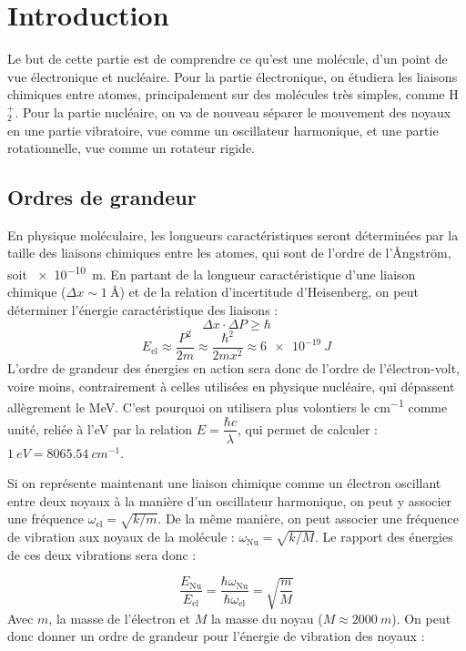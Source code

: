 


\section{Introduction}


Le but de cette partie est de comprendre ce qu'est une molécule, d'un point de vue électronique et nucléaire. Pour la partie électronique, on étudiera les liaisons chimiques entre atomes, principalement sur des molécules très simples, comme H$^+_2$. Pour la partie nucléaire, on va de nouveau séparer le mouvement des noyaux en une partie vibratoire, vue comme un oscillateur harmonique, et une partie rotationnelle, vue comme un rotateur rigide.


\subsection{Ordres de grandeur}


En physique moléculaire, les longueurs caractéristiques seront déterminées par la taille des liaisons chimiques entre les atomes, qui sont de l'ordre de l'Ångström, soit \SI{e-10}{m}. En partant de la longueur caractéristique d'une liaison chimique ($\Delta x \sim \SI{1}{\angstrom}$) et de la relation d'incertitude d'Heisenberg, on peut déterminer l'énergie caractéristique des liaisons :
\[
    \Delta x\cdot \Delta P \geq \hbar
\]
\[
    E_\text{el} \approx \dfrac{P^2}{2m} \approx \dfrac{\hbar ^2}{2mx^2} \approx \SI{6e-19}{J}
\]
L'ordre de grandeur des énergies en action sera donc de l'ordre de l'électron-volt, voire moins, contrairement à celles utilisées en physique nucléaire, qui dépassent allègrement le \si{MeV}. C'est pourquoi on utilisera plus volontiers le \si{cm^{-1}} comme unité, reliée à l'\si{eV} par la relation $E = \dfrac{\hbar c}{\lambda}$, qui permet de calculer : $\SI{1}{eV} = \SI{8065.54}{cm^{-1}}$.


Si on représente maintenant une liaison chimique comme un électron oscillant entre deux noyaux à la manière d'un oscillateur harmonique, on peut y associer une fréquence $\omega_\text{el} = \sqrt{k/m}$. De la même manière, on peut associer une fréquence de vibration aux noyaux de la molécule : $\omega_\text{Nu} = \sqrt{k/M}$. Le rapport des énergies de ces deux vibrations sera donc :


\[
    \dfrac{E_\text{Nu}}{E_\text{el}} = \dfrac{\hbar \omega_\text{Nu}}{\hbar\omega_\text{el}} = \sqrt{\dfrac{m}{M}}
\]
Avec $m$, la masse de l'électron et $M$ la masse du noyau ($M \approx \SI{2000}{m}$). On peut donc donner un ordre de grandeur pour l'énergie de vibration des noyaux :


